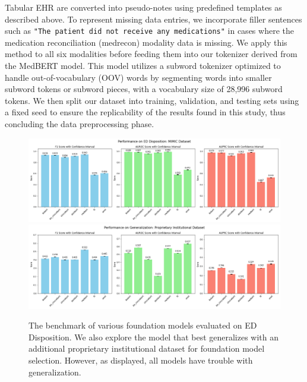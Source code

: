 \documentclass{article}
\theoremstyle{plain}
\theoremstyle{definition}
\theoremstyle{remark}
\begin{document}
{Tabular EHR are converted into pseudo-notes using predefined templates as described above.} {To represent missing data entries, we incorporate} filler sentences such as \texttt{"The patient did not receive any medications"} in cases where the medication reconciliation (medrecon) modality data is missing. We apply this method to all six modalities before feeding them into our tokenizer derived from the MedBERT model. This model utilizes a subword tokenizer optimized to handle out-of-vocabulary (OOV) words by segmenting words into smaller subword tokens or subword pieces, with a vocabulary size of 28,996 subword tokens. We then split our dataset into training, validation, and testing sets using a fixed seed to ensure the replicability of the results found in this study, thus concluding the data preprocessing phase.

 \begin{figure}[h!]
   \centering 
   \includegraphics[width=5in]{plots/fm_eval.png} 
    \includegraphics[width=5in]{plots/generalize.png} 
   \caption{The benchmark of various foundation models evaluated on ED Disposition. We also explore the model that best generalizes with an additional proprietary institutional dataset for foundation model selection. However, as displayed, all models have trouble with generalization.}
   \label{fm} 
 \end{figure} 
\end{document}
